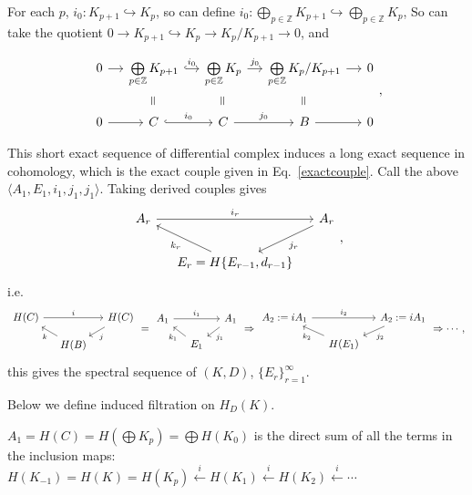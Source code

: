 \documentclass{article}
\newcommand{\verteq}{\rotatebox{90}{$\,=$}}
\theoremstyle{mystyle}
\theoremstyle{remark}
\numberwithin{equation}{section}
\begin{document}
For each $p$, $i_0\colon K_{p+1}\hookrightarrow K_p$, so can define $i_0\colon \bigoplus_{p\in \mathbb{Z}} K_{p+1}\hookrightarrow \bigoplus_{p\in \mathbb{Z}} K_p$, So can take the quotient $0\rightarrow K_{p+1}\hookrightarrow K_p\rightarrow K_p/K_{p+1}\rightarrow 0$, and


\begin{equation}\label{filtrationCCB}
\begin{tikzcd}[row sep = 0cm,column sep = small]
0\ar[r] &\bigoplus\limits_{p\in \mathbb{Z}} K_{p+1}\ar[r,hook,"i_0"] &
\bigoplus\limits_{p\in \mathbb{Z}} K_p \ar[r,"j_0"] &\bigoplus\limits_{p\in \mathbb{Z}}  K_p/K_{p+1} \ar[r]& 0\\
& \verteq & \verteq & \verteq & \\
0\ar[r] & C \ar[r,hook,"i_0"] & C \ar[r,"j_0"] & B \ar[r] & 0
\end{tikzcd},
\end{equation} 

This short exact sequence of differential complex induces a long exact sequence in cohomology, which is the exact couple given in Eq.~\eqref{exactcouple}. Call the above $\langle A_1,E_1,i_1,j_1,j_1\rangle$. 
Taking derived couples gives
$$
\begin{tikzcd}[column sep = small]
A_r\ar[rr,"i_r"] &&A_r\ar[dl,"j_r"]\\
&E_r=H\{E_{r-1},d_{r-1}\}\ar[ul,"k_r"]&
\end{tikzcd},
$$
i.e.
\begin{equation}\label{exacttriangles123}
\begin{tikzcd}[column sep = small,row sep = small]
H(C)\ar[rr,"i"]&&H(C)\ar[dl,"j"]\\
&H(B)\ar[ul,"k"]&
\end{tikzcd}
=
\begin{tikzcd}[column sep = small,row sep = small]
A_1\ar[rr,"i_1"] &&A_1\ar[dl,"j_1"]\\
&E_1\ar[ul,"k_1"]
&
\end{tikzcd}
\Rightarrow
\begin{tikzcd}[column sep = small,row sep = small]
A_2:=iA_1\ar[rr,"i_2"] &&A_2:=iA_1\ar[dl,"j_2"]\\
&H(E_1)\ar[ul,"k_2"]&
\end{tikzcd}\Rightarrow \cdots,
\end{equation}
this gives  the spectral sequence of $(K,D)$, $\{E_r\}_{r=1}^\infty$. 

Below we define induced filtration on $H_D(K)$.

$A_1 = H(C) = H(\bigoplus K_p) = \bigoplus H(K_0)$ is the direct sum of all the terms in the inclusion maps: $H(K_{-1}) = H(K)=H(K_p)\xleftarrow{i}H(K_1)\xleftarrow{i}H(K_2)\xleftarrow{i}\cdots$
\end{document}
